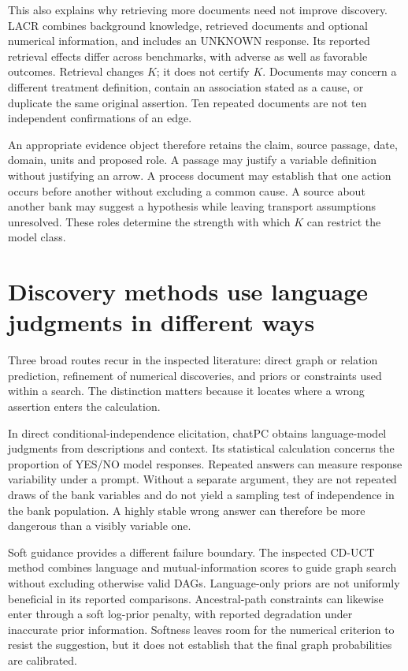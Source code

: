 This also explains why retrieving more documents need not improve discovery.
LACR combines background knowledge, retrieved documents and optional numerical
information, and includes an UNKNOWN response. Its reported retrieval effects
differ across benchmarks, with adverse as well as favorable outcomes.
\citep{v12_la_2402_15301} Retrieval changes $K$; it does not certify $K$. Documents
may concern a different treatment definition, contain an association stated as
a cause, or duplicate the same original assertion. Ten repeated documents are
not ten independent confirmations of an edge.

An appropriate evidence object therefore retains the claim, source passage,
date, domain, units and proposed role. A passage may justify a variable
definition without justifying an arrow. A process document may establish that
one action occurs before another without excluding a common cause. A source
about another bank may suggest a hypothesis while leaving transport assumptions
unresolved. These roles determine the strength with which $K$ can restrict the
model class.

\section{Discovery methods use language judgments in different ways}

Three broad routes recur in the inspected literature: direct graph or relation
prediction, refinement of numerical discoveries, and priors or constraints used
within a search. \citep{v12_la_2402_11068} The distinction matters because it locates
where a wrong assertion enters the calculation.

In direct conditional-independence elicitation, chatPC obtains language-model
judgments from descriptions and context. Its statistical calculation concerns
the proportion of YES/NO model responses. \citep{v12_la_2406_07378} Repeated answers
can measure response variability under a prompt. Without a separate argument,
they are not repeated draws of the bank variables and do not yield a sampling
test of independence in the bank population. A highly stable wrong answer can
therefore be more dangerous than a visibly variable one.

Soft guidance provides a different failure boundary. The inspected CD-UCT
method combines language and mutual-information scores to guide graph search
without excluding otherwise valid DAGs. Language-only priors are not uniformly
beneficial in its reported comparisons. \citep{v12_la_2405_13551} Ancestral-path
constraints can likewise enter through a soft log-prior penalty, with reported
degradation under inaccurate prior information. \citep{v12_la_2306_16902} Softness
leaves room for the numerical criterion to resist the suggestion, but it does
not establish that the final graph probabilities are calibrated.

